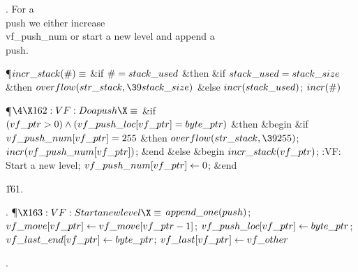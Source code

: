. For a \\{push} we either increase \\{vf\_push\_num} or start a new level
and
append a \\{push}.

\Y\P\D {}$\\{incr\_stack}(\#)\S$\1\6
\&{if} $\#=\\{stack\_used}$ \1\&{then}\6
\&{if} $\\{stack\_used}=\\{stack\_size}$ \1\&{then}\5
$\\{overflow}(\\{str\_stack},\39\\{stack\_size})$\6
\4\&{else} $\\{incr}(\\{stack\_used})$;\2\2\2\6
$\\{incr}(\#)$\par
\Y\P$\4\X162:VF: Do a \\{push}\X\S$\6
\&{if} $(\\{vf\_ptr}>0)\W(\\{vf\_push\_loc}[\\{vf\_ptr}]=\\{byte\_ptr})$ \1%
\&{then}\6
\&{begin} \&{if} $\\{vf\_push\_num}[\\{vf\_ptr}]=255$ \1\&{then}\5
$\\{overflow}(\\{str\_stack},\39255)$;\2\6
$\\{incr}(\\{vf\_push\_num}[\\{vf\_ptr}])$;\6
\&{end}\6
\4\&{else} \&{begin} $\\{incr\_stack}(\\{vf\_ptr})$;\5
:VF: Start a new level\X;\6
$\\{vf\_push\_num}[\\{vf\_ptr}]\K0$;\6
\&{end}\2\par
\U161.\fi

. \P$\X163:VF: Start a new level\X\S$\6
$\\{append\_one}(\\{push})$;\5
$\\{vf\_move}[\\{vf\_ptr}]\K\\{vf\_move}[\\{vf\_ptr}-1]$;\5
$\\{vf\_push\_loc}[\\{vf\_ptr}]\K\\{byte\_ptr}$;\5
$\\{vf\_last\_end}[\\{vf\_ptr}]\K\\{byte\_ptr}$;\5
$\\{vf\_last}[\\{vf\_ptr}]\K\\{vf\_other}$\par
{}.\fi

